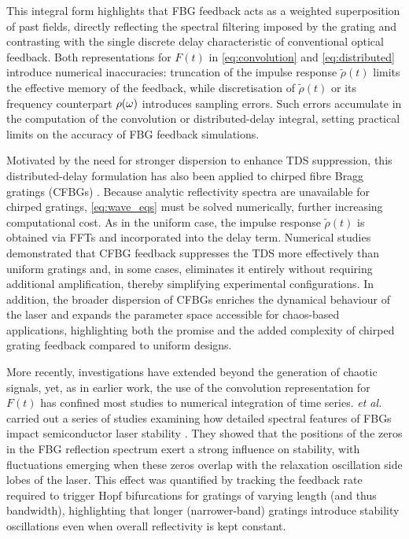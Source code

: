 %
This integral form highlights that FBG feedback acts as a weighted superposition of past fields, directly reflecting the spectral filtering imposed by the grating and contrasting with the single discrete delay characteristic of conventional optical feedback.
Both representations for $F(t)$ in \eqref{eq:convolution} and \eqref{eq:distributed} introduce numerical inaccuracies: truncation of the impulse response $\tilde{\rho}(t)$ limits the effective memory of the feedback, while discretisation of $\tilde{\rho}(t)$ or its frequency counterpart $\rho(\omega)$ introduces sampling errors.
Such errors accumulate in the computation of the convolution or distributed-delay integral, setting practical limits on the accuracy of FBG feedback simulations.
%
\par
%
Motivated by the need for stronger dispersion to enhance TDS suppression, this distributed-delay formulation has also been applied to chirped fibre Bragg gratings (CFBGs) \cite{wang2017time, wang2019key, wang2023critical, chao2020permutation}.
Because analytic reflectivity spectra are unavailable for chirped gratings, \eqref{eq:wave_eqs} must be solved numerically, further increasing computational cost.
As in the uniform case, the impulse response $\tilde{\rho}(t)$ is obtained via FFTs and incorporated into the delay term.
Numerical studies demonstrated that CFBG feedback suppresses the TDS more effectively than uniform gratings and, in some cases, eliminates it entirely without requiring additional amplification, thereby simplifying experimental configurations.
In addition, the broader dispersion of CFBGs enriches the dynamical behaviour of the laser and expands the parameter space accessible for chaos-based applications, highlighting both the promise and the added complexity of chirped grating feedback compared to uniform designs.
%
\par
%
More recently, investigations have extended beyond the generation of chaotic signals, yet, as in earlier work, the use of the convolution representation for $F(t)$ has confined most studies to numerical integration of time series. 
\Skenderas \textit{et al.} carried out a series of studies examining how detailed spectral features of FBGs impact semiconductor laser stability \cite{skenderas2021feedback, skenderas2022influence, skenderas2024impact}. 
They showed that the positions of the zeros in the FBG reflection spectrum exert a strong influence on stability, with fluctuations emerging when these zeros overlap with the relaxation oscillation side lobes of the laser. 
This effect was quantified by tracking the feedback rate required to trigger Hopf bifurcations for gratings of varying length (and thus bandwidth), highlighting that longer (narrower-band) gratings introduce stability oscillations even when overall reflectivity is kept constant. 
